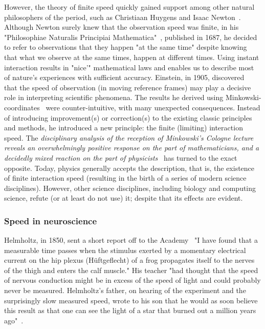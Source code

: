 However, the theory of finite speed quickly gained support among other
natural philosophers of the period, such as Christiaan Huygens and
Isaac Newton~\cite{Roemer:1676}. Although Newton surely knew that
the observation speed was finite, in his "Philosophiae Naturalis
Principiai Mathematica"~\cite{NewtonPrincipia:1687}, published
in 1687, he decided to refer to observations that they happen "at
the same time" despite knowing that what we observe at the same
times, happen at different times. Using instant interaction results
in "nice'" mathematical laws and enables us to describe most of
nature's experiences with sufficient accuracy.
%
Einstein, in 1905, discovered~\cite{EinsteinSpecial:1905} that the speed of observation (in moving
reference frames) may play a decisive role in interpreting scientific
phenomena. The results he derived using Minkowski-coordinates~\cite{Minkowski:1908} were
counter-intuitive, with many unexpected consequences. Instead of introducing
improvement(s) or correction(s) to the existing classic principles
and methods, he introduced a new principle: the finite (limiting) interaction speed.
The \textit{disciplinary analysis of the reception of
Minkowski's Cologne lecture reveals an overwhelmingly
positive response on the part of mathematicians, and a decidedly mixed
reaction on the part of physicists}~\cite{Minkowski100:2008}
has turned to the exact opposite. Today, physics generally accepts
the description, that is, the existence of finite interaction speed
(resulting in the birth of a series of modern science disciplines).
However, other science disciplines, including biology and computing
science, refute (or at least do not use) it; despite that its effects are evident.



\subsubsection[In neuroscience]{Speed in neuroscience\label{sec:Physics-SpeedNeuro}}

Helmholtz, in 1850, sent a short report off to the Academy~\cite{ HelmholtzReport:1850}
"I have found that a measurable time passes when the stimulus exerted
by a momentary electrical current on the hip plexus (Hüftgeflecht) of
a frog propagates itself to the nerves of the thigh and enters the
calf muscle." His teacher "had thought that the speed of nervous
conduction might be in excess of the speed of light and could probably
never be measured. Helmholtz's father, on hearing of the experiment
and the surprisingly slow measured speed, wrote to his son that he
would as soon believe this result as that one can see the light of
a star that burned out a million years ago"~\cite{HelmoltzHistory:1851}.

